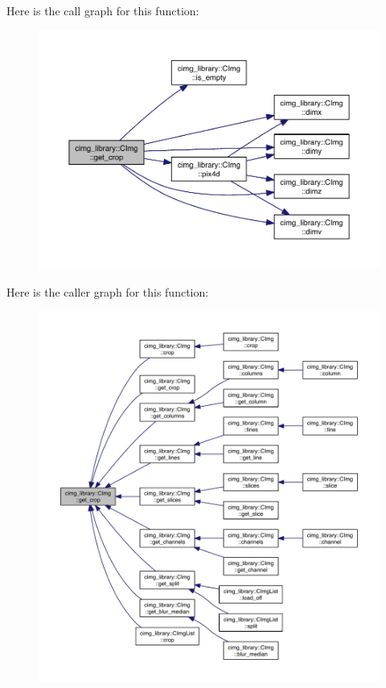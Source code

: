 Here is the call graph for this function\-:
\nopagebreak
\begin{figure}[H]
\begin{center}
\leavevmode
\includegraphics[width=350pt]{structcimg__library_1_1_c_img_aa9c7b716b8e131422b7b9dc32690ed0c_cgraph}
\end{center}
\end{figure}




Here is the caller graph for this function\-:
\nopagebreak
\begin{figure}[H]
\begin{center}
\leavevmode
\includegraphics[width=350pt]{structcimg__library_1_1_c_img_aa9c7b716b8e131422b7b9dc32690ed0c_icgraph}
\end{center}
\end{figure}


